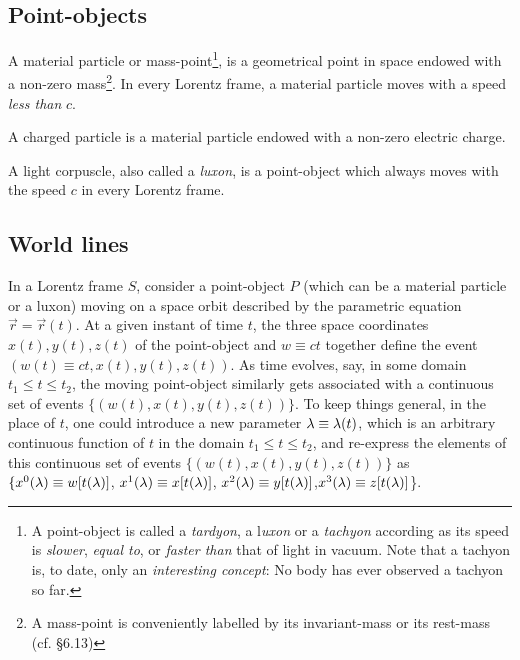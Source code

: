 \begin{small}
\subsection{Point-objects}

 A material particle 
  or 
mass-point\footnote{A point-object is called a 
\textsl{tardyon},  a l\textsl{uxon } 
 or a \textsl{tachyon}  
according as its speed is \textsl{slower}, 
\textsl{equal to}, or \textsl{faster than} that of 
light in vacuum. Note that a tachyon is, to date, only 
an \textsl{interesting concept}: No body has ever 
observed a tachyon so far.}, is a geometrical point in 
space endowed with a non-zero mass\footnote{A mass-point 
is conveniently labelled by its invariant-mass or its  
rest-mass (cf. \S6.13) }. In every Lorentz frame, 
a material particle moves with a speed \textsl{less than} 
$c$. 

A charged particle is a material 
particle endowed with a non-zero electric charge. 

 A light corpuscle, also called a 
\textsl{luxon}, is a point-object which always moves 
with the speed $c$ in every Lorentz frame. 

\subsection{World lines}
In a Lorentz frame $S$, consider a point-object 
 $P$ (which can be a material 
particle or a luxon) moving on a space orbit described 
by the parametric equation $\vec{r}=\vec{r}(t)$. At a 
given instant of time $t$, the three space coordinates 
$x(t),y(t), z(t)$ of the point-object and $w\equiv ct$ 
together define the {event} $(w(t)\equiv ct, x(t), 
y(t), z(t))$. As time evolves, say, in some domain $t_1 
\leq t\leq t_2$, the moving point-object similarly gets 
associated with a continuous set of events $\{(w(t), 
x(t),y(t), z(t))\}$. To keep things general, in 
the place of $t$, one could introduce a new parameter 
${\lambda}\equiv {\lambda}(t)$, which is an arbitrary continuous 
function of  $t$ in the domain $t_1 \leq t\leq t_2$, 
and re-express the elements of this  continuous set of 
events  $\{(w(t), x(t),y(t), z(t))\}$ as 
$\{x^0({\lambda})\equiv w[t({\lambda})] $, \; $x^1({\lambda}) \equiv 
x[t({\lambda})] $, \;$x^2({\lambda})\equiv 
y[t({\lambda})]$,\;$x^3({\lambda})\equiv z[t({\lambda})]$\}.


\end{small}

